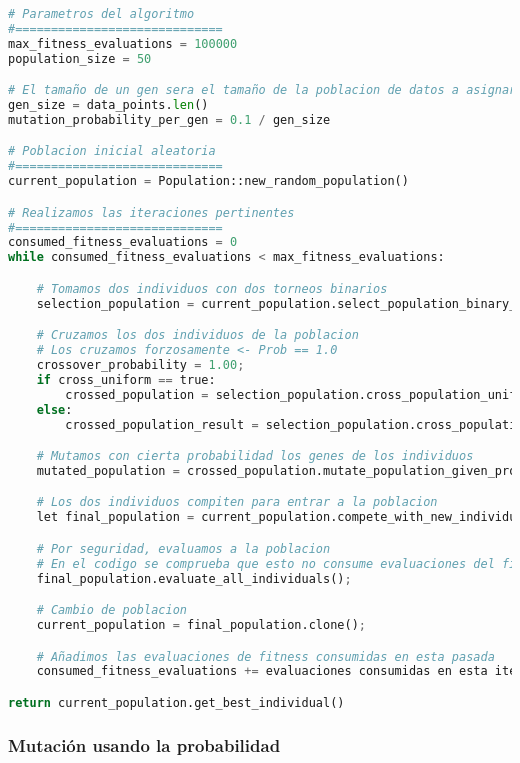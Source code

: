 \documentclass[11pt]{article}
\begin{document}
\begin{lstlisting}[language=Python, style=Boxed]
# Parametros del algoritmo
#=============================
max_fitness_evaluations = 100000
population_size = 50

# El tamaño de un gen sera el tamaño de la poblacion de datos a asignar a clusters
gen_size = data_points.len()
mutation_probability_per_gen = 0.1 / gen_size

# Poblacion inicial aleatoria
#=============================
current_population = Population::new_random_population()

# Realizamos las iteraciones pertinentes
#=============================
consumed_fitness_evaluations = 0
while consumed_fitness_evaluations < max_fitness_evaluations:

    # Tomamos dos individuos con dos torneos binarios
    selection_population = current_population.select_population_binary_tournament(2);

    # Cruzamos los dos individuos de la poblacion
    # Los cruzamos forzosamente <- Prob == 1.0
    crossover_probability = 1.00;
    if cross_uniform == true:
        crossed_population = selection_population.cross_population_uniform(crossover_probability)
    else:
        crossed_population_result = selection_population.cross_population_segment(crossover_probability)

    # Mutamos con cierta probabilidad los genes de los individuos
    mutated_population = crossed_population.mutate_population_given_prob(mutation_probability_per_gen)

    # Los dos individuos compiten para entrar a la poblacion
    let final_population = current_population.compete_with_new_individuals(mutated_population);

    # Por seguridad, evaluamos a la poblacion
    # En el codigo se comprueba que esto no consume evaluaciones del fitness
    final_population.evaluate_all_individuals();

    # Cambio de poblacion
    current_population = final_population.clone();

    # Añadimos las evaluaciones de fitness consumidas en esta pasada
    consumed_fitness_evaluations += evaluaciones consumidas en esta iteracion

return current_population.get_best_individual()
\end{lstlisting}

\subsubsection{Mutación usando la probabilidad}
\end{document}

